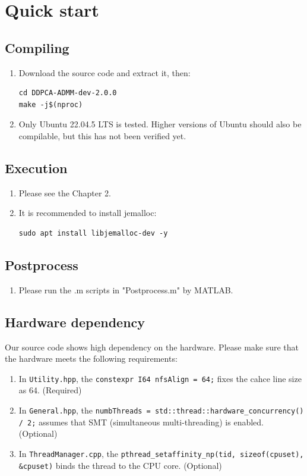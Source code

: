 \chapter{Quick start}

\section{Compiling}

\begin{enumerate}[label=$\blacksquare$]
\item Download the source code and extract it, then: 
\begin{lstlisting}[breaklines=true]
cd DDPCA-ADMM-dev-2.0.0
make -j$(nproc)
\end{lstlisting}
\item Only Ubuntu 22.04.5 LTS is tested. Higher versions of Ubuntu should also be compilable, but this has not been verified yet.
\end{enumerate}

\section{Execution}

\begin{enumerate}[label=$\blacksquare$]
\item Please see the Chapter 2.
\item It is recommended to install jemalloc:
\begin{lstlisting}[breaklines=true]
sudo apt install libjemalloc-dev -y
\end{lstlisting}
\end{enumerate}

\section{Postprocess}

\begin{enumerate}[label=$\blacksquare$]
\item Please run the .m scripts in "Postprocess.m" by MATLAB.
\end{enumerate}

\section{Hardware dependency}

Our source code shows high dependency on the hardware. Please make sure that the hardware meets the following requirements:

\begin{enumerate}[label=$\blacksquare$]
\item In \lstinline{Utility.hpp}, the \lstinline{constexpr I64 nfsAlign = 64;} fixes the cahce line size as 64. (Required)
\item In \lstinline{General.hpp}, the \lstinline{numbThreads = std::thread::hardware_concurrency() / 2;} assumes that SMT (simultaneous multi-threading) is enabled. (Optional)
\item In \lstinline{ThreadManager.cpp}, the \lstinline{pthread_setaffinity_np(tid, sizeof(cpuset), &cpuset)} binds the thread to the CPU core. (Optional)
\end{enumerate}
